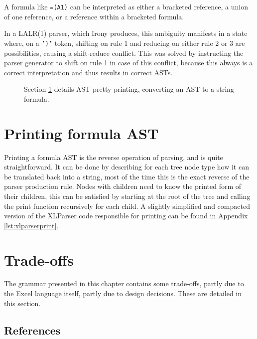 A formula like \texttt{=(A1)} can be interpreted as either a bracketed reference, a union of one reference, or a reference within a bracketed formula.

In a LALR(1) parser, which Irony produces, this ambiguity manifests in a state where, on a \texttt{')'} token, shifting on rule 1 and reducing on either rule 2 or 3 are possibilities, causing a shift-reduce conflict.
This was solved by instructing the parser generator to shift on rule 1 in case of this conflict, because this always is a correct interpretation and thus results in correct ASTs.

\newpage

\noindent
\begin{figure}[h!]
	\hspace*{0.003\textwidth}
	
	\caption{Section \ref{sec:printing} details AST pretty-printing, converting an AST to a string formula.}
\end{figure}

\section{Printing formula AST}
\label{sec:printing}

Printing a formula AST is the reverse operation of parsing, and is quite straightforward.
It can be done by describing for each tree node type how it can be translated back into a string, most of the time this is the exact reverse of the parser production rule.
Nodes with children need to know the printed form of their children, this can be satisfied by starting at the root of the tree and calling the print function recursively for each child.
A slightly simplified and compacted version of the XLParser code responsible for printing can be found in Appendix \ref{lst:xlparserprint}.

\section{Trade-offs}

The grammar presented in this chapter contains some trade-offs, partly due to the Excel language itself, partly due to design decisions.
These are detailed in this section.

\subsection{References}
\label{tradeoff:references}

